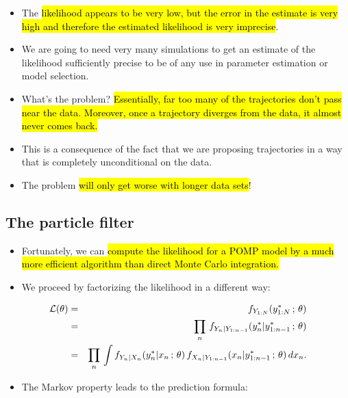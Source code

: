 \documentclass[]{article}
\providecommand{\tightlist}{%
  \setlength{\itemsep}{0pt}\setlength{\parskip}{0pt}}
\begin{document}
\begin{itemize}
\item
  The \hl{likelihood appears to be very low, but the error in the estimate
  is very high and therefore the estimated likelihood is very imprecise}.
\item
  We are going to need very many simulations to get an estimate of the
  likelihood sufficiently precise to be of any use in parameter
  estimation or model selection.
\item
  What's the problem? \hl{Essentially, far too many of the trajectories
  don't pass near the data. Moreover, once a trajectory diverges from
  the data, it almost never comes back.}
\item
  This is a consequence of the fact that we are proposing trajectories
  in a way that is completely unconditional on the data.
\item
  The problem \hl{will only get worse with longer data sets}!
\end{itemize}

\hypertarget{the-particle-filter}{\subsection{The particle
filter}\label{the-particle-filter}}

\begin{itemize}
\item
  Fortunately, we can \hl{compute the likelihood for a POMP model by a much
  more efficient algorithm than direct Monte Carlo integration.}
\item
  We proceed by factorizing the likelihood in a different way:
\end{itemize}

\begin{eqnarray}
\mathcal{L}(\theta)&=&f_{Y_{1:N}}(y^*_{1:N}\, ; \, \theta)
\\
&=&
\prod_{n}\,f_{Y_n|Y_{1:n-1}}(y^*_n|y^*_{1:n-1}\, ; \,\theta) 
\\
&=&
\prod_{n}\,\int f_{Y_n|X_n}(y^*_n|x_n\, ; \,\theta)\,f_{X_n|Y_{1:n-1}}(x_n|y^*_{1:n-1}\, ; \,\theta)\, dx_{n}.
\end{eqnarray}

\begin{itemize}
\tightlist
\item
  The Markov property leads to the prediction formula:
\end{itemize}
\end{document}
